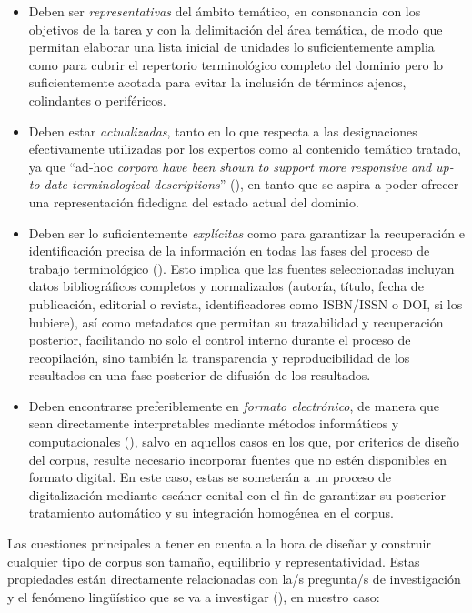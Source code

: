\begin{itemize}

\item Deben ser \textit{representativas} del ámbito temático, en consonancia con los objetivos de la tarea y con la delimitación del área temática, de modo que permitan elaborar una lista inicial de unidades lo suficientemente amplia como para cubrir el repertorio terminológico completo del dominio pero lo suficientemente acotada para evitar la inclusión de términos ajenos, colindantes o periféricos.

\item Deben estar \textit{actualizadas}, tanto en lo que respecta a las designaciones efectivamente utilizadas por los expertos como al contenido temático tratado, ya que ``ad-hoc \emph{corpora have been shown to support more responsive and up-to-date terminological descriptions}'' (\cite{laursen2014using}), en tanto que se aspira a poder ofrecer una representación fidedigna del estado actual del dominio.

\item Deben ser lo suficientemente \textit{explícitas} como para garantizar la recuperación e identificación precisa de la información en todas las fases del proceso de trabajo terminológico (\cite{cabre1999terminology}). Esto implica que las fuentes seleccionadas incluyan datos bibliográficos completos y normalizados (autoría, título, fecha de publicación, editorial o revista, identificadores como ISBN/ISSN o DOI, si los hubiere), así como metadatos que permitan su trazabilidad y recuperación posterior, facilitando no solo el control interno durante el proceso de recopilación, sino también la transparencia y reproducibilidad de los resultados en una fase posterior de difusión de los resultados.

\item Deben encontrarse preferiblemente en \textit{formato electrónico}, de manera que sean directamente interpretables mediante métodos informáticos y computacionales (\cite{negrillo2010corpus}), salvo en aquellos casos en los que, por criterios de diseño del corpus, resulte necesario incorporar fuentes que no estén disponibles en formato digital. En este caso, estas se someterán a un proceso de digitalización mediante escáner cenital con el fin de garantizar su posterior tratamiento automático y su integración homogénea en el corpus.

\end{itemize}

Las cuestiones principales a tener en cuenta a la hora de diseñar y construir cualquier tipo de corpus son tamaño, equilibrio y representatividad. Estas propiedades están directamente relacionadas con la/s pregunta/s de investigación y el fenómeno lingüístico que se va a investigar (\cite{randi2010building,lavid2005lenguaje}), en nuestro caso:

